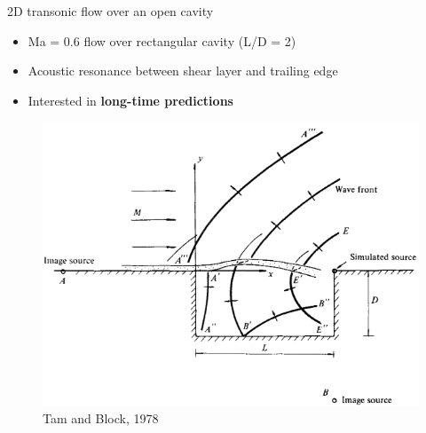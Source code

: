 \documentclass[]{beamer}
\begin{document}
\begin{frame}{2D transonic flow over an open cavity}
    \begin{itemize}
		\item Ma = 0.6 flow over rectangular cavity (L/D = 2)
		\item Acoustic resonance between shear layer and trailing edge
		\item Interested in \textbf{long-time predictions}
	\end{itemize}
	\begin{minipage}{0.4\linewidth}
		\vspace{1em}
		\begin{figure}
			\includegraphics[width=0.99\linewidth]{experiments/2d_cavity/tamAndBlockCavity.png}
			\caption*{\tiny{Tam and Block, 1978}}
		\end{figure}
	\end{minipage}
	\begin{minipage}{0.59\linewidth}
		\begin{figure}
		\end{figure}
	\end{minipage}
\end{frame}
\end{document}
